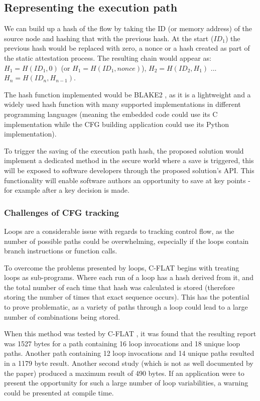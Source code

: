\subsection{Representing the execution path}

We can build up a hash of the flow by taking the ID (or memory address) of the source node and hashing that with the previous hash. At the start ($ID_1$) the previous hash would be replaced with zero, a nonce or a hash created as part of the static attestation process. The resulting chain would appear as: 
$H_1 = H(ID_1,0)$ (or $H_1 = H(ID_1,nonce)$), $H_2 = H(ID_2,H_1)$ ... $H_n = H(ID_n,H_{n-1})$.

The hash function implemented would be BLAKE2 \cite{Aumasson2013}, as it is a lightweight and a widely used hash function with many supported implementations in different programming languages (meaning the embedded code could use its C implementation while the CFG building application could use its Python implementation).

To trigger the saving of the execution path hash, the proposed solution would implement a dedicated method in the secure world where a save is triggered, this will be exposed to software developers through the proposed solution's API. This functionality will enable software authors an opportunity to save at key points - for example after a key decision is made.

\subsubsection*{Challenges of CFG tracking}

Loops are a considerable issue with regards to tracking control flow, as the number of possible paths could be overwhelming, especially if the loops contain branch instructions or function calls.

To overcome the problems presented by loops, C-FLAT \cite{Abera2016} begins with treating loops as sub-programs. Where each run of a loop has a hash derived from it, and the total number of each time that hash was calculated is stored (therefore storing the number of times that exact sequence occurs). This has the potential to prove problematic, as a variety of paths through a loop could lead to a large number of combinations being stored. 

When this method was tested by C-FLAT \cite{Abera2016}, it was found that the resulting report was 1527 bytes for a path containing 16 loop invocations and 18 unique loop paths. Another path containing 12 loop invocations and 14 unique paths resulted in a 1179 byte result. Another second study (which is not as well documented by the paper) produced a maximum result of 490 bytes. If an application were to present the opportunity for such a large number of loop variabilities, a warning could be presented at compile time.

